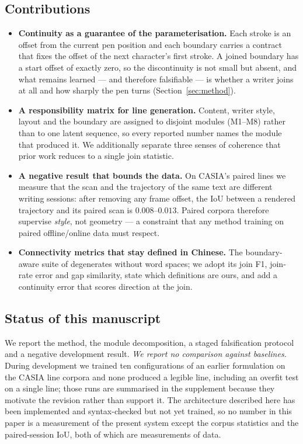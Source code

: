 \documentclass[conference]{IEEEtran}
\begin{document}
\subsection{Contributions}
\begin{itemize}
\item \textbf{Continuity as a guarantee of the parameterisation.} Each stroke is an offset from
the current pen position and each boundary carries a contract that fixes the offset of the next
character's first stroke. A joined boundary has a start offset of exactly zero, so the
discontinuity is not small but absent, and what remains learned --- and therefore falsifiable
--- is whether a writer joins at all and how sharply the pen turns (Section~\ref{sec:method}).
\item \textbf{A responsibility matrix for line generation.} Content, writer style, layout and
the boundary are assigned to disjoint modules (M1--M8) rather than to one latent sequence, so
every reported number names the module that produced it. We additionally separate three senses
of coherence that prior work reduces to a single join statistic.
\item \textbf{A negative result that bounds the data.} On CASIA's paired lines we measure that
the scan and the trajectory of the same text are different writing sessions: after removing any
frame offset, the IoU between a rendered trajectory and its paired scan is $0.008$--$0.013$.
Paired corpora therefore supervise \emph{style}, not geometry --- a constraint that any method
training on paired offline/online data must respect.
\item \textbf{Connectivity metrics that stay defined in Chinese.} The boundary-aware suite of
\cite{boundink} degenerates without word spaces; we adopt its join F1, join-rate error and gap
similarity, state which definitions are ours, and add a continuity error that scores direction
at the join.
\end{itemize}

\subsection{Status of this manuscript}
We report the method, the module decomposition, a staged falsification protocol and a negative
development result. \emph{We report no comparison against baselines.} During development we
trained ten configurations of an earlier formulation on the CASIA line corpora and none
produced a legible line, including an overfit test on a single line; those runs are summarised
in the supplement because they motivate the revision rather than support it. The architecture
described here has been implemented and syntax-checked but not yet trained, so no number in
this paper is a measurement of the present system except the corpus statistics and the
paired-session IoU, both of which are measurements of data.
\end{document}
